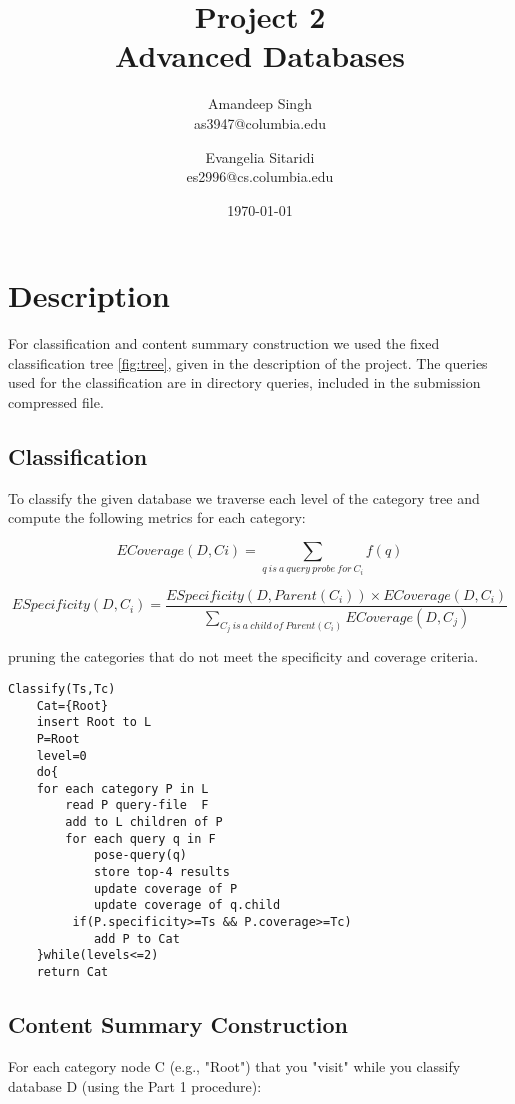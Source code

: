 \documentclass[11pt]{article}
\title{Project 2 \\ Advanced Databases \\}
\author{
Amandeep  Singh\\as3947@columbia.edu
\and
Evangelia  Sitaridi \\ es2996@cs.columbia.edu
}
\date{\today}
\begin{document}
\maketitle

\section{Description}
For classification and content summary construction we used the fixed classification tree \ref{fig:tree}, given in the description of the project. The queries
used for the classification are in directory queries, included in the submission compressed file.


\subsection{Classification}
To classify the given database we traverse each level of the category tree and compute the following metrics for each category:

\[ECoverage(D,Ci)=\sum_{q \ is \ a \ query \ probe \ for \ C_i}{f(q)} \]

\[ESpecificity(D, C_i ) = \frac{ESpecificity(D, Parent(C_i )) \times ECoverage(D, C_i )} {\sum_{C_j \  is \ a \ child \ of \ Parent(C_i)} {ECoverage(D,C_j)}} \]

pruning the categories that do not meet the specificity and coverage criteria.

\begin{verbatim}
Classify(Ts,Tc)
    Cat={Root}
    insert Root to L
    P=Root
    level=0
    do{
    for each category P in L
        read P query-file  F
        add to L children of P
        for each query q in F
            pose-query(q)
            store top-4 results
            update coverage of P 
            update coverage of q.child
         if(P.specificity>=Ts && P.coverage>=Tc)
            add P to Cat
    }while(levels<=2)
    return Cat
\end{verbatim}

\subsection{Content Summary Construction}

For each category node C (e.g., "Root") that you "visit" while you classify database D (using the Part 1 procedure):
\end{document}
